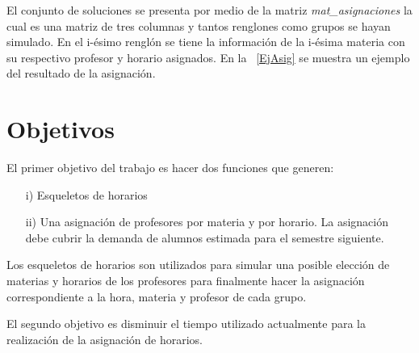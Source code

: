 El conjunto de soluciones se presenta por medio de la matriz \textit{mat\_asignaciones} la cual es una matriz de tres columnas y tantos renglones como grupos se hayan simulado. En el i-ésimo renglón se tiene la información de la i-ésima materia con su respectivo profesor y horario asignados. En la \tablename{~\ref{EjAsig}} se muestra un ejemplo del resultado de la asignación.

\begin{table}[H]
\centering
{}
\caption[\textit{Ejemplo de asignación}]{\textit{Ejemplo de asignación: Esta tabla muestra un ejemplo de la matriz mat\_asignaciones que tiene 3 columnas (Materia, Profesor, Horario).}}\label{EjAsig}
\end{table}


\section{Objetivos}

El primer objetivo del trabajo es hacer dos funciones que generen:
  
  \begin{enumerate}
\item[i)] Esqueletos de horarios

\item[ii)] Una asignación de profesores por materia y por horario. La asignación debe cubrir la demanda de alumnos estimada para el semestre siguiente.
\end{enumerate}


Los esqueletos de horarios son utilizados para simular una posible elección de materias y horarios de los profesores para finalmente hacer la asignación correspondiente a la hora, materia y profesor de cada grupo.

El segundo objetivo es disminuir el tiempo utilizado actualmente para la realización de la asignación de horarios.


